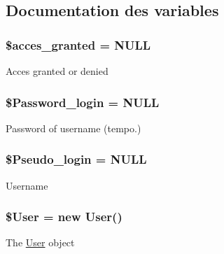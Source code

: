 \subsection{Documentation des variables}
\hypertarget{verify_login_8php_a5767baa45643e3308557b6235c1624f3}{
\subsubsection[{\$acces\-\_\-granted}]{\setlength{\rightskip}{0pt plus 5cm}\$acces\-\_\-granted = N\-U\-L\-L}}\label{verify_login_8php_a5767baa45643e3308557b6235c1624f3}
Acces granted or denied \hypertarget{verify_login_8php_a86bc4d20608407aa4b4a7940aaef6002}{
\subsubsection[{\$\-Password\-\_\-login}]{\setlength{\rightskip}{0pt plus 5cm}\$Password\-\_\-login = N\-U\-L\-L}}\label{verify_login_8php_a86bc4d20608407aa4b4a7940aaef6002}
Password of username (tempo.) \hypertarget{verify_login_8php_a84dc6f144c3be815ccad38c60fa27409}{
\subsubsection[{\$\-Pseudo\-\_\-login}]{\setlength{\rightskip}{0pt plus 5cm}\$Pseudo\-\_\-login = N\-U\-L\-L}}\label{verify_login_8php_a84dc6f144c3be815ccad38c60fa27409}
Username \hypertarget{verify_login_8php_a77cc6ebf3902e67557ab5de9317a11c2}{
\subsubsection[{\$\-User}]{\setlength{\rightskip}{0pt plus 5cm}\${\bf User} = new {\bf User}()}}\label{verify_login_8php_a77cc6ebf3902e67557ab5de9317a11c2}
The \hyperlink{class_user}{User} object 